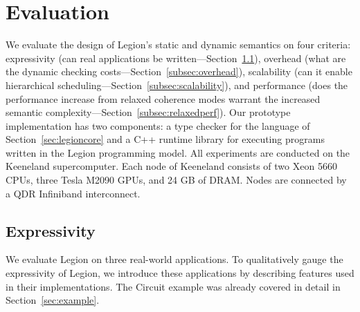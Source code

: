 
\section{Evaluation}
\label{sec:evaluation}

We evaluate the design of Legion's static and dynamic semantics on four criteria:
expressivity (can real applications be written---Section~\ref{subsec:expressivity}),
overhead  (what are the dynamic checking costs---Section~\ref{subsec:overhead}),
scalability (can it enable hierarchical scheduling---Section~\ref{subsec:scalability}),
and performance  (does the performance increase from relaxed coherence modes 
warrant the increased semantic complexity---Section~\ref{subsec:relaxedperf}).
Our prototype implementation has two components: a type checker
for the language of Section~\ref{sec:legioncore} and a C++ runtime library
for executing programs written in the Legion programming model.  All experiments
are conducted on the Keeneland supercomputer\cite{Keeneland}.  Each node of Keeneland
consists of two Xeon 5660 CPUs, three Tesla M2090 GPUs, and 24 GB of DRAM.  Nodes
are connected by a QDR Infiniband interconnect.

\subsection{Expressivity}
\label{subsec:expressivity}
We evaluate Legion on three real-world applications.  To qualitatively gauge the 
expressivity of Legion, we introduce these applications
by describing features used in their implementations.
The Circuit example was already covered in detail in Section~\ref{sec:example}.


